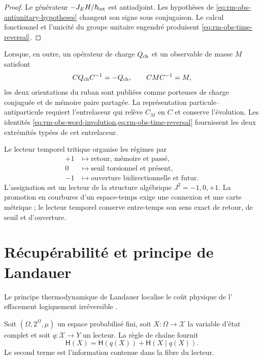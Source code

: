 \begin{proof}
Le générateur \(-J_EH/\hbar_{\rm int}\) est antiadjoint. Les hypothèses de
\cref{eq:rm-obs-antiunitary-hypotheses} changent son signe sous conjugaison.
Le calcul fonctionnel et l'unicité du groupe unitaire engendré produisent
\cref{eq:rm-obs-time-reversal}.
\end{proof}

Lorsque, en outre, un opérateur de charge \(Q_{\rm ch}\) et un observable de
masse \(M\) satisfont
\begin{equation}
 CQ_{\rm ch}C^{-1}=-Q_{\rm ch},
 \qquad
 CMC^{-1}=M,
 \label{eq:rm-obs-charge-mass-parity}
\end{equation}
les deux orientations du ruban sont publiées comme porteuses de charge
conjuguée et de mémoire paire partagée. La représentation particule--
antiparticule requiert l'entrelaceur qui relève \(C_M\) en \(C\) et
conserve l'évolution. Les identités
\cref{eq:rm-obs-word-involution,eq:rm-obs-time-reversal} fournissent les
deux extrémités typées de cet entrelaceur.

Le lecteur temporel tritique organise les régimes par
\begin{equation}
 \begin{aligned}
 +1&\longmapsto\text{retour, mémoire et passé},\\
 0&\longmapsto\text{seuil torsionnel et présent},\\
 -1&\longmapsto\text{ouverture bidirectionnelle et futur}.
 \end{aligned}
 \label{eq:rm-obs-temporal-trit}
\end{equation}
L'assignation est un lecteur de la structure algébrique
\(J^2=-1,0,+1\). La promotion en courbures d'un espace-temps exige une
connexion et une carte métrique ; le lecteur temporel conserve entre-temps
son sens exact de retour, de seuil et d'ouverture.

\section{Récupérabilité et principe de Landauer}

Le principe thermodynamique de Landauer localise le coût physique de l'
effacement logiquement irréversible \cite{Landauer1961}.

Soit \((\Omega,2^\Omega,\mu)\) un espace probabilisé fini, soit
\(X:\Omega\to\mathcal X\) la variable d'état complet et soit
\(q:\mathcal X\to Y\) un lecteur. La règle de chaîne fournit
\begin{equation}
 \mathsf H(X)
 =\mathsf H(q(X))+\mathsf H(X\mid q(X)).
 \label{eq:rm-obs-entropy-chain}
\end{equation}
Le second terme est l'information contenue dans la fibre du lecteur.

